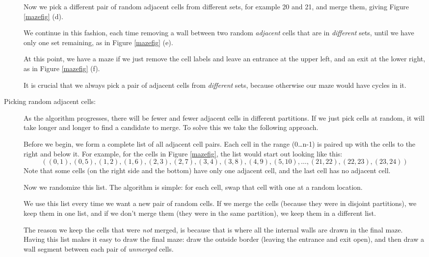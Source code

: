 \documentclass{article}
\begin{document}
\begin{description}
  Now we pick a different pair of random adjacent cells from different
  sets, for example 20 and 21, and merge them, giving Figure
  \ref{mazefig} (d).


  We continue in this fashion, each time removing a wall between two
  random {\em adjacent} cells that are in {\em different} sets, until
  we have only one set remaining, as in Figure \ref{mazefig} (e).  


At this point, we have a maze if we just remove the cell labels
and leave an entrance at the upper left, and an
exit at the lower right, as in Figure \ref{mazefig} (f).
  
It is crucial that we always pick a pair of adjacent cells from {\em
  different} sets, because otherwise our maze would have cycles in it.


\item[Picking random adjacent cells:] As the algorithm progresses,
  there will be fewer and fewer adjacent cells in different
  partitions.  If we just pick cells at random, it will take longer
  and longer to find a candidate to merge.  To solve this we take the
  following approach.

  Before we begin, we form a complete list of all adjacent cell
  pairs.  Each cell in the range (0\ldots n-1) is paired up with the
  cells to the right and below it.  For example, for the cells in
  Figure \ref{mazefig}, the list would start out looking like this:
  \[
  ((0,1), (0,5), (1,2), (1,6), (2,3), (2,7), (3,4), (3,8), (4,9),
  (5,10), \ldots, (21,22), (22,23), (23,24) )
  \]
  Note that some cells (on the right side and the bottom) have only
  one adjacent cell, and the last cell has no adjacent cell.

  Now we randomize this list.  The algorithm is simple:  for each
  cell, swap that cell with one at a random location.

  We use this list every time we want a new pair of random cells.  If
  we merge the cells (because they were in disjoint partitions), we
  keep them in one list, and if we don't merge them (they were in the
  same partition), we keep them in a different list.

  The reason we keep the cells that were {\em not} merged, is because
  that is where all the internal walls are drawn in the final maze.
  Having this list makes it easy to draw the final maze: draw the
  outside border (leaving the entrance and exit open), and then draw a
  wall segment between each pair of {\em unmerged} cells.



\end{description}
\end{document}
